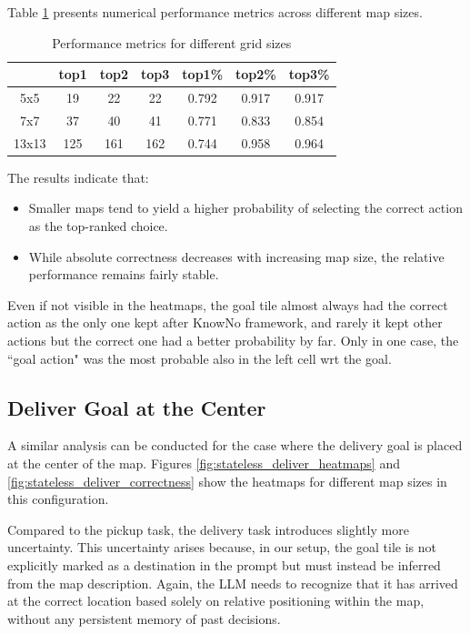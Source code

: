 Table \ref{tab:performance} presents numerical performance metrics across
different map sizes.

\vspace{5mm}
\begin{table}[h]
  \centering
  \begin{tabular}{c|ccc|ccc}
          & top1 & top2 & top3 & top1\% & top2\% & top3\% \\
    \hline
    5x5   & 19   & 22   & 22   & 0.792  & 0.917  & 0.917  \\
    7x7   & 37   & 40   & 41   & 0.771  & 0.833  & 0.854  \\
    13x13 & 125  & 161  & 162  & 0.744  & 0.958  & 0.964  \\
  \end{tabular}
  \caption{Performance metrics for different grid sizes}
  \label{tab:performance}
\end{table}
\vspace{5mm}

The results indicate that:
\begin{itemize}
  \item Smaller maps tend to yield a higher probability of selecting the correct
    action as the top-ranked choice.

  \item While absolute correctness decreases with increasing map size, the
    relative performance remains fairly stable.
\end{itemize}

Even if not visible in the heatmaps, the goal tile almost always had the correct
action as the only one kept after KnowNo framework, and rarely it kept other actions
but the correct one had a better probability by far. Only in one case, the ``goal
action" was the most probable also in the left cell wrt the goal.

\subsection{Deliver Goal at the Center}

A similar analysis can be conducted for the case where the delivery goal is placed
at the center of the map. Figures \ref{fig:stateless_deliver_heatmaps} and
\ref{fig:stateless_deliver_correctness} show the heatmaps for different map
sizes in this configuration.

Compared to the pickup task, the delivery task introduces slightly more uncertainty.
This uncertainty arises because, in our setup, the goal tile is not explicitly
marked as a destination in the prompt but must instead be inferred from the map
description. Again, the LLM needs to recognize that it has arrived at the
correct location based solely on relative positioning within the map, without any
persistent memory of past decisions.

